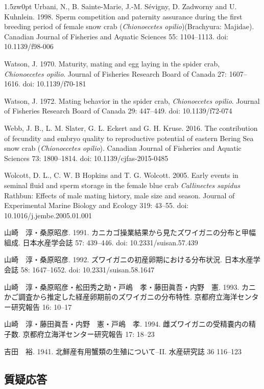 \begin{indentation}{1.5zw}{0pt}
Urbani, N., B. Sainte-Marie, J.-M. S\'{e}vigny, D. Zadworny and U. Kuhnlein. 1998. Sperm competition and paternity assurance during the first breeding period of female snow crab (\textit{Chionoecetes opilio})(Brachyura: Majidae). Canadian Journal of Fisheries and Aquatic Sciences 55: 1104--1113. doi: 10.1139/f98-006

Watson, J. 1970. Maturity, mating and egg laying in the spider crab, \textit{Chionoecetes opilio}. Journal of Fisheries Research Board of Canada 27: 1607--1616. doi: 10.1139/f70-181

Watson, J. 1972. Mating behavior in the spider crab, \textit{Chionoecetes opilio}. Journal of Fisheries Research Board of Canada 29: 447--449. doi: 10.1139/f72-074

Webb, J. B., L. M. Slater, G. L. Eckert and G. H. Kruse. 2016. The contribution of fecundity and embryo quality to reproductive potential of eastern Bering Sea snow crab (\textit{Chionoecetes opilio}). Canadian Journal of Fisheries and Aquatic Sciences 73: 1800--1814. doi: 10.1139/cjfas-2015-0485

Wolcott, D. L., C. W. B Hopkins and T. G. Wolcott. 2005. Early events in seminal fluid and sperm storage in the female blue crab \textit{Callinectes sapidus} Rathbun: Effects of male mating history, male size and season. Journal of Experimental Marine Biology and Ecology 319: 43--55. doi: 10.1016/j.jembe.2005.01.001

山崎　淳・桑原昭彦. 1991. カニカゴ操業結果から見たズワイガニの分布と甲幅組成. 日本水産学会誌 57: 439--446. doi: 10.2331/suisan.57.439

山崎　淳・桑原昭彦. 1992. ズワイガニの初産卵期における分布状況. 日本水産学会誌 58: 1647--1652. doi: 10.2331/suisan.58.1647

山崎　淳・桑原昭彦・舩田秀之助・戸嶋　孝・藤田眞吾・内野　憲. 1993. カニかご調査から推定した経産卵期前のズワイガニの分布特性. 京都府立海洋センター研究報告 16: 10--17

山崎　淳・藤田眞吾・内野　憲・戸嶋　孝. 1994. 雌ズワイガニの受精嚢内の精子数. 京都府立海洋センター研究報告 17: 18--23

吉田　裕. 1941. 北鮮産有用蟹類の生殖について--II. 水産研究誌 36 116--123

\end{indentation}

\subsection*{質疑応答}

